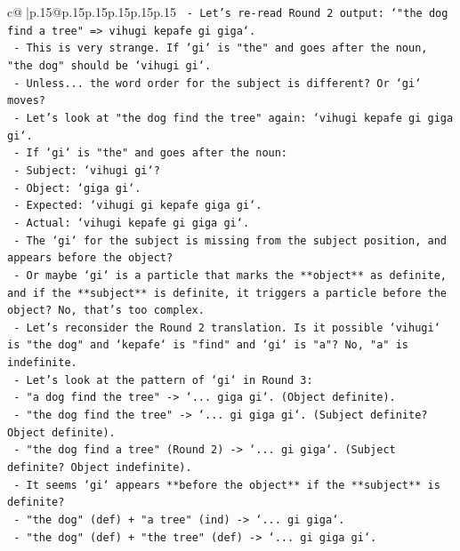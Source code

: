 \documentclass{article}
\begin{document}
{\begin{supertabular}{c@{$\;$}|p{.15\linewidth}@{}p{.15\linewidth}p{.15\linewidth}p{.15\linewidth}p{.15\linewidth}p{.15\linewidth}}
{{{\texttt{              {-} Let's re{-}read Round 2 output: `"the dog find a tree" => vihugi kepafe gi giga`.} \\
\texttt{              {-} This is very strange. If `gi` is "the" and goes after the noun, "the dog" should be `vihugi gi`.} \\
\texttt{              {-} Unless... the word order for the subject is different? Or `gi` moves?} \\
\texttt{              {-} Let's look at "the dog find the tree" again: `vihugi kepafe gi giga gi`.} \\
\texttt{                {-} If `gi` is "the" and goes after the noun:} \\
\texttt{                  {-} Subject: `vihugi gi`?} \\
\texttt{                  {-} Object: `giga gi`.} \\
\texttt{                  {-} Expected: `vihugi gi kepafe giga gi`.} \\
\texttt{                  {-} Actual: `vihugi kepafe gi giga gi`.} \\
\texttt{                  {-} The `gi` for the subject is missing from the subject position, and appears before the object?} \\
\texttt{                  {-} Or maybe `gi` is a particle that marks the **object** as definite, and if the **subject** is definite, it triggers a particle before the object? No, that's too complex.} \\
\texttt{              {-} Let's reconsider the Round 2 translation. Is it possible `vihugi` is "the dog" and `kepafe` is "find" and `gi` is "a"? No, "a" is indefinite.} \\
\texttt{              {-} Let's look at the pattern of `gi` in Round 3:} \\
\texttt{                {-} "a dog find the tree" {-}> `... giga gi`. (Object definite).} \\
\texttt{                {-} "the dog find the tree" {-}> `... gi giga gi`. (Subject definite? Object definite).} \\
\texttt{                {-} "the dog find a tree" (Round 2) {-}> `... gi giga`. (Subject definite? Object indefinite).} \\
\texttt{              {-} It seems `gi` appears **before the object** if the **subject** is definite?} \\
\texttt{                {-} "the dog" (def) + "a tree" (ind) {-}> `... gi giga`.} \\
\texttt{                {-} "the dog" (def) + "the tree" (def) {-}> `... gi giga gi`.} \\
}}}
\end{supertabular}}
\end{document}
